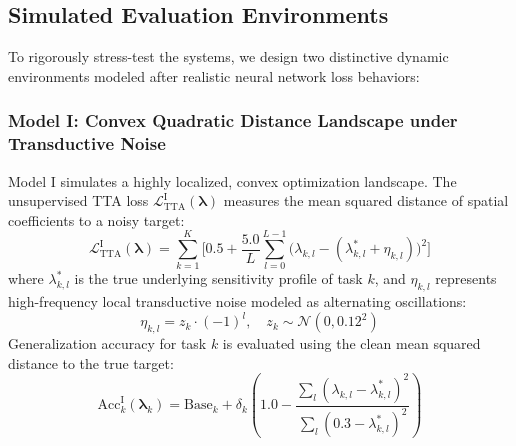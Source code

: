 \subsection{Simulated Evaluation Environments}
To rigorously stress-test the systems, we design two distinctive dynamic environments modeled after realistic neural network loss behaviors:

\subsubsection{Model I: Convex Quadratic Distance Landscape under Transductive Noise}
Model I simulates a highly localized, convex optimization landscape. The unsupervised TTA loss $\mathcal{L}_{\text{TTA}}^{\text{I}}(\boldsymbol{\lambda})$ measures the mean squared distance of spatial coefficients to a noisy target:
\begin{equation}
\mathcal{L}_{\text{TTA}}^{\text{I}}(\boldsymbol{\lambda}) = \sum_{k=1}^K \bigg[ 0.5 + \frac{5.0}{L} \sum_{l=0}^{L-1} \Big( \lambda_{k, l} - (\lambda^*_{k, l} + \eta_{k, l}) \Big)^2 \bigg]
\end{equation}
where $\lambda^*_{k, l}$ is the true underlying sensitivity profile of task $k$, and $\eta_{k, l}$ represents high-frequency local transductive noise modeled as alternating oscillations:
\begin{equation}
\eta_{k, l} = z_k \cdot (-1)^l, \quad z_k \sim \mathcal{N}(0, 0.12^2)
\end{equation}
Generalization accuracy for task $k$ is evaluated using the clean mean squared distance to the true target:
\begin{equation}
\text{Acc}_k^{\text{I}}(\boldsymbol{\lambda}_k) = \text{Base}_k + \delta_k \left( 1.0 - \frac{\sum_l (\lambda_{k, l} - \lambda^*_{k, l})^2}{\sum_l (0.3 - \lambda^*_{k, l})^2} \right)
\end{equation}

